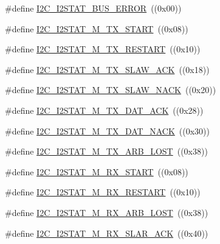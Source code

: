 \begin{DoxyCompactItemize}
\item 
\#define \hyperlink{group__I2C__17XX__40XX_ga7c1e7f0f166cdc547263229c5ce07cb0}{I2\-C\-\_\-\-I2\-S\-T\-A\-T\-\_\-\-B\-U\-S\-\_\-\-E\-R\-R\-O\-R}~((0x00))
\item 
\#define \hyperlink{group__I2C__17XX__40XX_ga5c44c05176052f6040cd40d680bc2a91}{I2\-C\-\_\-\-I2\-S\-T\-A\-T\-\_\-\-M\-\_\-\-T\-X\-\_\-\-S\-T\-A\-R\-T}~((0x08))
\item 
\#define \hyperlink{group__I2C__17XX__40XX_gad41d0d1392b7d905b22b9c5015f2e48f}{I2\-C\-\_\-\-I2\-S\-T\-A\-T\-\_\-\-M\-\_\-\-T\-X\-\_\-\-R\-E\-S\-T\-A\-R\-T}~((0x10))
\item 
\#define \hyperlink{group__I2C__17XX__40XX_gab91c158252efeb1a3a139faec3622ae0}{I2\-C\-\_\-\-I2\-S\-T\-A\-T\-\_\-\-M\-\_\-\-T\-X\-\_\-\-S\-L\-A\-W\-\_\-\-A\-C\-K}~((0x18))
\item 
\#define \hyperlink{group__I2C__17XX__40XX_ga15729d9436fbf4c23a22e7cdbc913552}{I2\-C\-\_\-\-I2\-S\-T\-A\-T\-\_\-\-M\-\_\-\-T\-X\-\_\-\-S\-L\-A\-W\-\_\-\-N\-A\-C\-K}~((0x20))
\item 
\#define \hyperlink{group__I2C__17XX__40XX_gad8c325e3c58aa8e7810797b9a6761596}{I2\-C\-\_\-\-I2\-S\-T\-A\-T\-\_\-\-M\-\_\-\-T\-X\-\_\-\-D\-A\-T\-\_\-\-A\-C\-K}~((0x28))
\item 
\#define \hyperlink{group__I2C__17XX__40XX_ga234f86990a6fd63f1d2064cbca4709a3}{I2\-C\-\_\-\-I2\-S\-T\-A\-T\-\_\-\-M\-\_\-\-T\-X\-\_\-\-D\-A\-T\-\_\-\-N\-A\-C\-K}~((0x30))
\item 
\#define \hyperlink{group__I2C__17XX__40XX_ga79230136402441c7e233c63fd2f71bdf}{I2\-C\-\_\-\-I2\-S\-T\-A\-T\-\_\-\-M\-\_\-\-T\-X\-\_\-\-A\-R\-B\-\_\-\-L\-O\-S\-T}~((0x38))
\item 
\#define \hyperlink{group__I2C__17XX__40XX_gab1f79137c62e306269633b005ad936da}{I2\-C\-\_\-\-I2\-S\-T\-A\-T\-\_\-\-M\-\_\-\-R\-X\-\_\-\-S\-T\-A\-R\-T}~((0x08))
\item 
\#define \hyperlink{group__I2C__17XX__40XX_gacb1c9145acd64a77464017f1dd9279c5}{I2\-C\-\_\-\-I2\-S\-T\-A\-T\-\_\-\-M\-\_\-\-R\-X\-\_\-\-R\-E\-S\-T\-A\-R\-T}~((0x10))
\item 
\#define \hyperlink{group__I2C__17XX__40XX_gaed32dea40cf84a1efb09e0c389579163}{I2\-C\-\_\-\-I2\-S\-T\-A\-T\-\_\-\-M\-\_\-\-R\-X\-\_\-\-A\-R\-B\-\_\-\-L\-O\-S\-T}~((0x38))
\item 
\#define \hyperlink{group__I2C__17XX__40XX_gacd29e4a94f8a533477dbbf026c0d525a}{I2\-C\-\_\-\-I2\-S\-T\-A\-T\-\_\-\-M\-\_\-\-R\-X\-\_\-\-S\-L\-A\-R\-\_\-\-A\-C\-K}~((0x40))
\item 

\end{DoxyCompactItemize}
